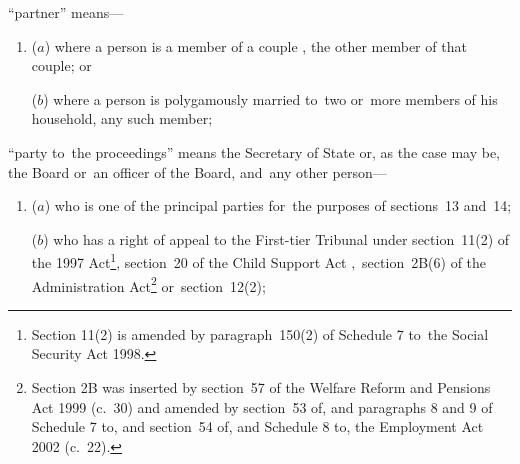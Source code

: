 \documentclass[12pt,a4paper]{article}
\begin{document}
\begin{enumerate}


“partner” means—
\begin{enumerate}\item[]
    ($a$) 
    where a person is a member of 
a couple%
, the other member of that couple; or

    ($b$) 
    where a person is polygamously married to~two or~more members of his household, any such member;
\end{enumerate}

“party to~the proceedings” means the Secretary of State 
or, as the case may be, the Board or~an officer of the Board,  %
and~any other person—
\begin{enumerate}\item[]
($a$) who is one of the principal parties for~the purposes of sections~13 and~14;

($b$) who has a right of appeal to 
the First-tier Tribunal  %
under section~11(2) of the 1997 Act\footnote{\frenchspacing Section 11(2) is amended by paragraph~150(2) of Schedule 7 to~the Social Security Act 1998.}, section~20 of the Child Support Act%
,~section~2B(6) of the Administration Act\footnote{Section 2B was inserted by section~57 of the Welfare Reform and Pensions Act 1999 (c.~30) and amended by section~53 of, and paragraphs 8 and 9 of Schedule 7 to, and section~54 of, and Schedule 8 to, the Employment Act 2002 (c.~22).}  %
or~section~12(2);
\end{enumerate}


\end{enumerate}
\end{document}
